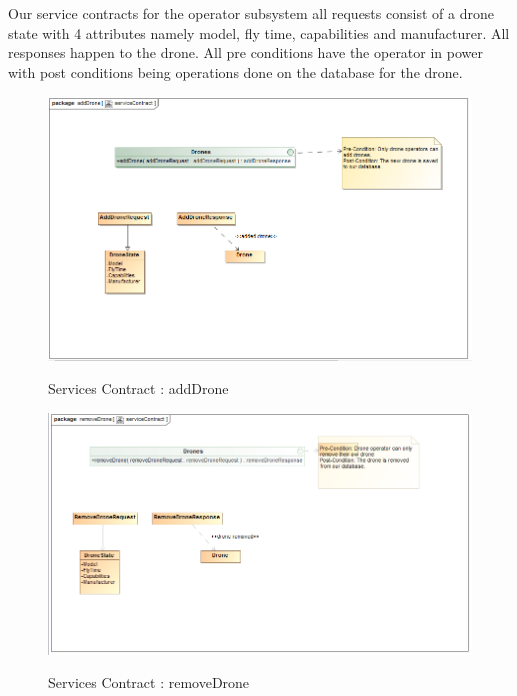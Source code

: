 \documentclass{article}
\begin{document}
		\section{}
		Our service contracts for the operator subsystem all requests consist of a drone state with 4 attributes namely model, fly time, capabilities and manufacturer. All responses happen to the drone. All pre conditions have the operator in power with post conditions being operations done on the database for the drone.
		\begin{figure}[H]
			\includegraphics[width=\textwidth]{SC_add.png}  \\
			\caption{Services Contract : addDrone}
		\end{figure}
		\begin{figure}[H]
			\includegraphics[width=\textwidth]{sc_delete.png}  \\
			\caption{Services Contract : removeDrone}
		\end{figure}
\end{document}
